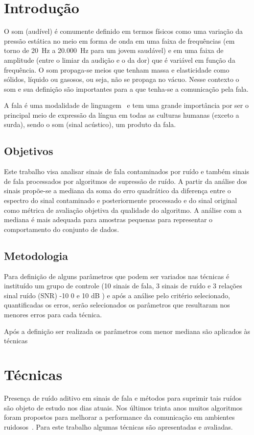 \chapter{Introdução}

O som (audível) é comumente definido em termos físicos como uma variação da pressão estática no meio em forma de onda em uma faixa de frequências (em torno de 20~Hz a 20.000~Hz para um jovem saudável) e em uma faixa de amplitude (entre o limiar da audição e o da dor) que é variável em função da frequência. O som propaga-se meios que tenham massa e elasticidade como sólidos, líquido ou gasosos, ou seja, não se propaga no vácuo. Nesse contexto o som e sua definição são importantes para a que tenha-se a comunicação pela fala.

A fala é uma modalidade de linguagem~\cite{kent2015analise} e tem uma grande importância por ser o principal meio de expressão da língua em todas as culturas humanas (exceto a surda), sendo o som (sinal acústico), um produto da fala.
\section{Objetivos}
Este trabalho visa analisar sinais de fala contaminados por ruído e também sinais de fala processados por algoritmos de supressão de ruído. A partir da análise dos sinais propõe-se a mediana da soma do erro quadrático da diferença entre o espectro do sinal contaminado e posteriormente processado e do sinal original como métrica de avaliação objetiva da qualidade do algoritmo. A análise com a mediana é mais adequada para amostras pequenas para representar o comportamento do conjunto de dados.

\section{Metodologia}
Para definição de alguns parâmetros que podem ser variados nas técnicas é instituído um grupo de controle (10 sinais de fala, 3 sinais de ruído e 3 relações sinal ruído (SNR) -10 0 e 10 dB ) e após a análise pelo critério selecionado, quantificadas os erros, serão selecionados os parâmetros que resultaram nos menores erros para cada técnica.

Após a definição ser realizada os parâmetros com menor mediana são aplicados às técnicas 
\chapter{Técnicas}
Presença de ruído aditivo em sinais de fala e métodos para suprimir tais ruídos são objeto de estudo nos dias atuais. Nos últimos trinta anos muitos algoritmos foram propostos para melhorar a performance da comunicação em ambientes ruidosos~\cite{Hu2007588}. Para este trabalho algumas técnicas são apresentadas e avaliadas.


